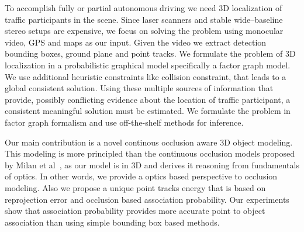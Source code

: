 

        To accomplish fully or partial autonomous driving we need 3D
        localization of traffic participants in the scene. 
        Since laser scanners and stable wide--baseline stereo setups are
        expensive, we focus on solving the problem using monocular video, GPS
        and maps as our input. Given the video we extract detection bounding
        boxes, ground plane and point tracks.
        We formulate the problem of 3D localization in a probabilistic graphical
        model specifically a factor graph model. We use additional heuristic
        constraints like collision constraint, that leads to a global consistent solution.
        Using these multiple sources of information that provide, possibly conflicting evidence about
        the location of traffic participant, a consistent meaningful solution must be estimated. 
        We formulate the problem in factor graph
        formalism and use off-the-shelf methods for inference.

        Our main contribution is a novel continous occlusion aware 3D object
        modeling. This modeling is more principled than the continuous occlusion models proposed by Milan et al~\cite{Milan_etal_2014}, as our model is in 3D and derives it reasoning from fundamentals of optics. 
         In other words, we provide a optics based
        perspective to occlusion modeling. Also we propose a unique point
        tracks energy that is based on reprojection error and occlusion based
        association probability. Our experiments show that association
        probability provides more accurate point to object association than
        using simple bounding box based methods.

